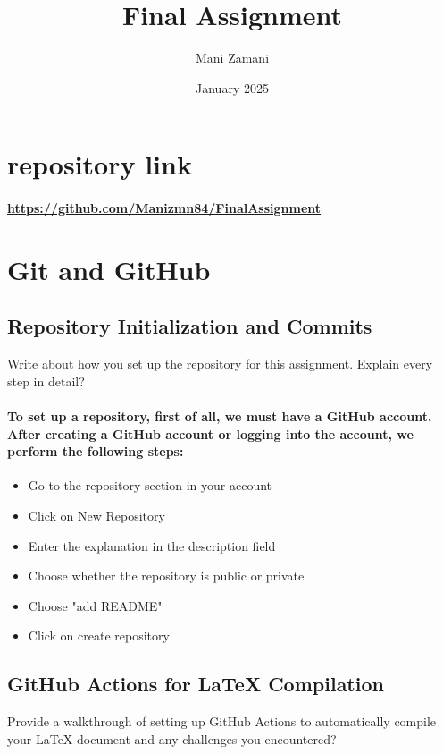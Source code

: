 \documentclass[11pt]{article}
\title{Final Assignment}
\author{Mani Zamani}
\date{January 2025}
\begin{document}
\maketitle
\newpage
\tableofcontents
\newpage

\section{repository link}
\paragraph{\url{https://github.com/Manizmn84/FinalAssignment}}

\section{Git and GitHub}
\subsection{Repository Initialization and Commits}

Write about how you set up the repository for this assignment. Explain every
 step in detail?

\paragraph{To set up a repository, first of all, we must have a GitHub account. After creating a GitHub account or logging into the account, we perform the following steps:}

\begin{itemize}
    \item Go to the repository section in your account
    \item Click on New Repository
    \item Enter the explanation in the description field
    \item Choose whether the repository is public or private
    \item Choose "add README"
    \item Click on create repository 
\end{itemize}

\subsection{GitHub Actions for LaTeX Compilation}
Provide a walkthrough of setting up GitHub Actions to automatically compile
 your LaTeX document and any challenges you encountered?\newline
\end{document}
